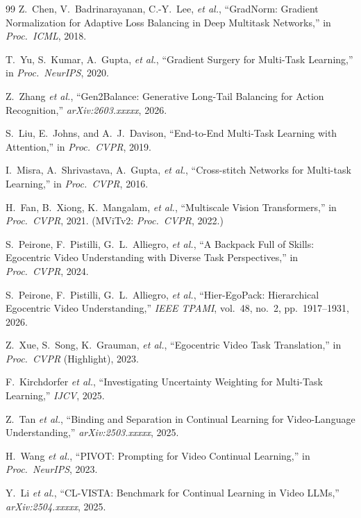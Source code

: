 \documentclass[10pt,journal,compsoc]{IEEEtran}
\begin{document}
\begin{thebibliography}{99}
Z.~Chen, V.~Badrinarayanan, C.-Y.~Lee, \emph{et al.},
``GradNorm: Gradient Normalization for Adaptive Loss Balancing in Deep Multitask Networks,''
in \emph{Proc.\ ICML}, 2018.

T.~Yu, S.~Kumar, A.~Gupta, \emph{et al.},
``Gradient Surgery for Multi-Task Learning,''
in \emph{Proc.\ NeurIPS}, 2020.

Z.~Zhang \emph{et al.},
``Gen2Balance: Generative Long-Tail Balancing for Action Recognition,''
\emph{arXiv:2603.xxxxx}, 2026.

S.~Liu, E.~Johns, and A.~J.~Davison,
``End-to-End Multi-Task Learning with Attention,''
in \emph{Proc.\ CVPR}, 2019.

I.~Misra, A.~Shrivastava, A.~Gupta, \emph{et al.},
``Cross-stitch Networks for Multi-task Learning,''
in \emph{Proc.\ CVPR}, 2016.

H.~Fan, B.~Xiong, K.~Mangalam, \emph{et al.},
``Multiscale Vision Transformers,''
in \emph{Proc.\ CVPR}, 2021. (MViTv2: \emph{Proc.\ CVPR}, 2022.)

S.~Peirone, F.~Pistilli, G.~L.~Alliegro, \emph{et al.},
``A Backpack Full of Skills: Egocentric Video Understanding with Diverse Task Perspectives,''
in \emph{Proc.\ CVPR}, 2024.

S.~Peirone, F.~Pistilli, G.~L.~Alliegro, \emph{et al.},
``Hier-EgoPack: Hierarchical Egocentric Video Understanding,''
\emph{IEEE TPAMI}, vol.~48, no.~2, pp.~1917--1931, 2026.

Z.~Xue, S.~Song, K.~Grauman, \emph{et al.},
``Egocentric Video Task Translation,''
in \emph{Proc.\ CVPR} (Highlight), 2023.

F.~Kirchdorfer \emph{et al.},
``Investigating Uncertainty Weighting for Multi-Task Learning,''
\emph{IJCV}, 2025.

Z.~Tan \emph{et al.},
``Binding and Separation in Continual Learning for Video-Language Understanding,''
\emph{arXiv:2503.xxxxx}, 2025.

H.~Wang \emph{et al.},
``PIVOT: Prompting for Video Continual Learning,''
in \emph{Proc.\ NeurIPS}, 2023.

Y.~Li \emph{et al.},
``CL-VISTA: Benchmark for Continual Learning in Video LLMs,''
\emph{arXiv:2504.xxxxx}, 2025.

\end{thebibliography}
\end{document}
